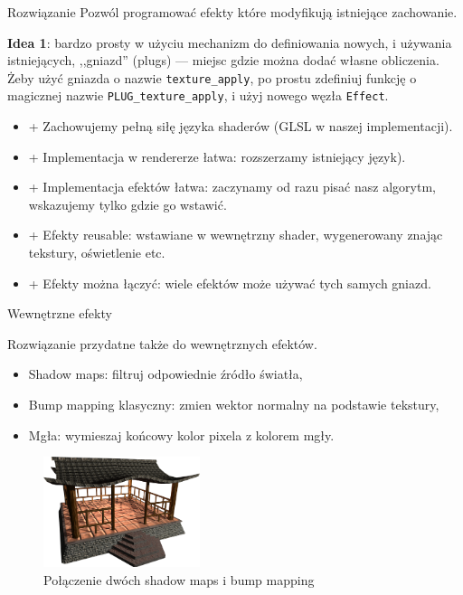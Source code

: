 \documentclass{beamer}
\begin{document}
\begin{frame}{Rozwiązanie}
Pozwól programować efekty które modyfikują istniejące zachowanie.

\textbf{Idea 1}: bardzo prosty w użyciu mechanizm do definiowania nowych,
i używania istniejących, ,,gniazd'' (plugs) --- miejsc gdzie można
dodać własne obliczenia. Żeby użyć gniazda o nazwie \texttt{texture\_apply},
po prostu zdefiniuj funkcję o magicznej nazwie \texttt{PLUG\_texture\_apply},
i użyj nowego węzła \texttt{Effect}.

\begin{itemize}
  \item + Zachowujemy pełną siłę języka shaderów (GLSL w naszej implementacji).
  \item + Implementacja w rendererze łatwa: rozszerzamy istniejący język).
  \item + Implementacja efektów łatwa: zaczynamy od razu pisać nasz algorytm,
    wskazujemy tylko gdzie go wstawić.
  \item + Efekty reusable: wstawiane w wewnętrzny shader, wygenerowany
    znając tekstury, oświetlenie etc.
  \item + Efekty można łączyć: wiele efektów może używać tych samych gniazd.
\end{itemize}
\end{frame}

\begin{frame}{Wewnętrzne efekty}

Rozwiązanie przydatne także do wewnętrznych efektów.

\begin{itemize}
  \item Shadow maps: filtruj odpowiednie źródło światła,
  \item Bump mapping klasyczny: zmien wektor normalny na podstawie tekstury,
  \item Mgła: wymieszaj końcowy kolor pixela z kolorem mgły.
\end{itemize}

\begin{figure}
  \centering
  \includegraphics[width=1.8in]{../rhan_shrine_5_everything}
  \caption{Połączenie dwóch shadow maps i bump mapping}
\end{figure}
\end{frame}
\end{document}
